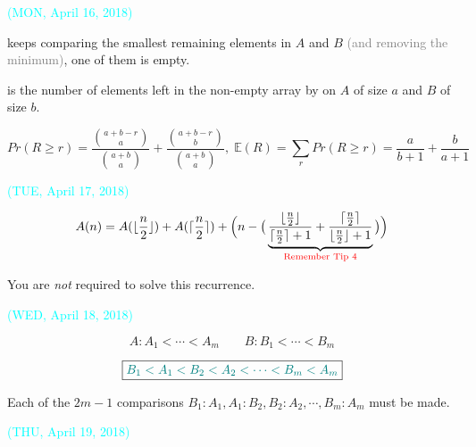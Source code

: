 \begin{frame}{}
  {\vspace{-0.30cm} \centerline{\textcolor{cyan}{\small (MON, April 16, 2018)}}}

  \vspace{0.50cm}
   keeps comparing the smallest remaining elements in $A$ and $B$
  {\small \textcolor{gray}{(and removing the minimum)}},  one of them is empty.

  \begin{definition}[$R$]
     is the number of elements left in the non-empty array by 
    on $A$ of size $a$ and $B$ of size $b$.
  \end{definition}

  \begin{theorem}
    \vspace{-0.50cm}
    \[
      Pr(R \ge r) = \frac{\binom{a + b - r}{a}}{\binom{a + b}{a}} + \frac{\binom{a + b - r}{b}}{\binom{a + b}{a}},
      \; \mathbb{E}(R) = \sum_{r} Pr(R \ge r) = \frac{a}{b+1} + \frac{b}{a+1}
    \]
  \end{theorem}
\end{frame}

\begin{frame}{}
  {\vspace{-0.50cm} \centerline{\textcolor{cyan}{\small (TUE, April 17, 2018)}}}

  \vspace{0.50cm}
  \[
    A(n) = A(\lfloor \frac{n}{2} \rfloor) + A(\lceil \frac{n}{2} \rceil) + 
    \Big(n - \big(\underbrace{\frac{\lfloor \frac{n}{2} \rfloor}{\lceil \frac{n}{2} \rceil + 1} 
    + \frac{\lceil \frac{n}{2} \rceil}{\lfloor \frac{n}{2} \rfloor + 1}}_{\text{\textcolor{red}{Remember Tip $4$}}}\big)\Big)
  \]

  \vspace{0.80cm}
  \centerline{You are {\it not} required to solve this recurrence.}
\end{frame}

\begin{frame}{}
  {\vspace{-0.50cm} \centerline{\textcolor{cyan}{\small (WED, April 18, 2018)}}}

  \[
    A: A_1 < \cdots < A_m \qquad B: B_1 < \cdots < B_m
  \]

  \[
    \boxed{\textcolor{teal}{B_1 < A_1 < B_2 < A_2 < \cdots < B_m < A_m}}
  \]

  \begin{theorem}
    Each of the $2m-1$ comparisons $B_1 : A_1, A_1 : B_2, B_2 : A_2, \cdots, B_m : A_m$ must be made.
  \end{theorem}
\end{frame}

\begin{frame}{}
  {\vspace{-0.50cm} \centerline{\textcolor{cyan}{\small (THU, April 19, 2018)}}}

\end{frame}

